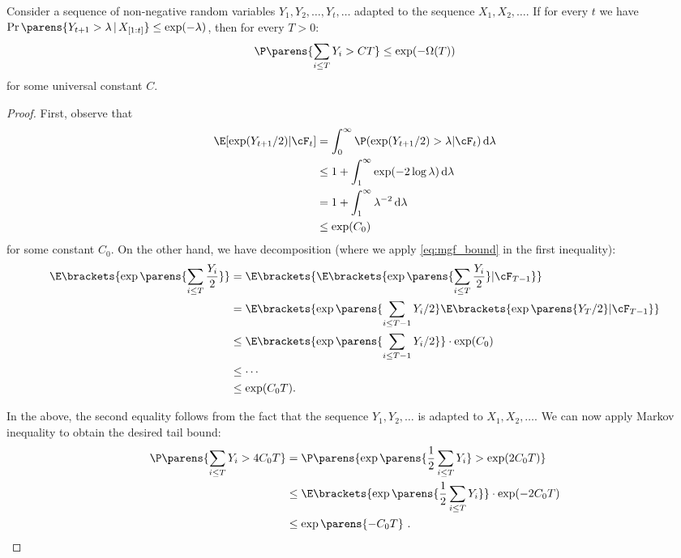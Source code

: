 \documentclass[11pt]{article}
\renewcommand{\d}{\,\mathrm{d}}
\begin{document}
\begin{lemma}
	\label{lem:sum-of-subexp}
	Consider a sequence of non-negative random variables $Y_1, Y_2, \ldots, Y_t, \ldots$ adapted to the sequence $X_1, X_2,\dots$. If for every $t$ we have $\Pr\parens{Y_{t+1} > \lambda\,|\, X_{[1:t]}} \le \exp(-\lambda)$, then for every $T>0$:
	\begin{equation*}
		\P\parens{\sum_{i \leq T} Y_i > CT} \leq \exp(-\Omega(T))
	\end{equation*}
	for some universal constant $C$.
\end{lemma}
\begin{proof}
	First, observe that
	\begin{align}
		\E[\exp(Y_{t+1}/2) | \cF_t] & = \int_{0}^\infty \P(\exp(Y_{t+1}/2) > \lambda | \cF_t) \d \lambda \notag\\
		& \leq 1 + \int_1^{\infty} \exp(-2 \log \lambda) \d \lambda  \notag\\
		& = 1 + \int_1^{\infty} \lambda^{-2} \d \lambda \notag\\
		& \leq \exp(C_0) \label{eq:mgf_bound}
	\end{align}
	for some constant $C_0$. On the other hand, we have decomposition (where we apply \cref{eq:mgf_bound} in the first inequality):
	\begin{align*}
		\E\brackets{\exp\parens{\sum_{i \leq T} \frac{Y_i}{2}}} & = \E\brackets{ \E\brackets{\exp \parens{\sum_{i \leq T} \frac{Y_i}{2}} | \cF_{T-1}}} \\
		& = \E \brackets{ \exp\parens{\sum_{i\leq T-1} Y_i/2} \E\brackets{\exp\parens{Y_T/2} | \cF_{T-1}}} \\
		& \leq \E \brackets{ \exp\parens{\sum_{i \leq T-1} Y_i/2} }\cdot \exp(C_0) \\
		& \leq \cdots \\
		& \leq \exp(C_0 T).
	\end{align*}
	
	\noindent In the above, the second equality follows from the fact that the sequence $Y_1,Y_2,\dots$ is adapted to $X_1,X_2,\dots$. 
	We can now apply Markov inequality to obtain the desired tail bound:
	\begin{align*}
		\P\parens{ \sum_{i \leq T} Y_i > 4 C_0 T} & = \P\parens{ \exp\parens{\frac{1}{2} \sum_{i \leq T} Y_i } > \exp(2 C_0 T)} \\
		& \leq \E\brackets{ \exp\parens{\frac{1}{2} \sum_{i \leq T} Y_i}} \cdot \exp(-2 C_0 T)\\
		& \leq \exp\parens{- C_0 T} \ . \qedhere
	\end{align*}
\end{proof}
\end{document}
